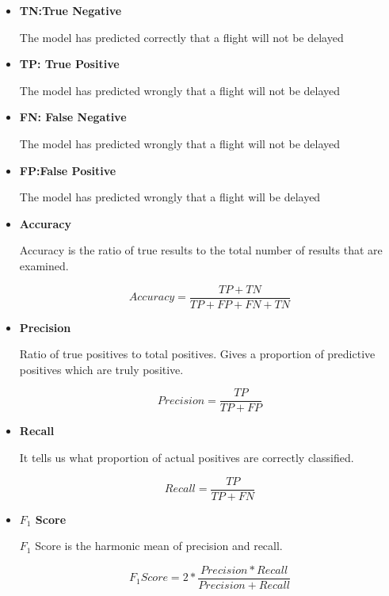 \documentclass[12pt,letter-paper]{article}
\begin{document}
        \begin{itemize}
            
            \item\textbf{TN:True Negative}
            
                The model has predicted correctly that a flight will not be delayed
                
            \item\textbf{TP: True Positive}
            
                The model has predicted wrongly that a flight will not be delayed
                
            \item\textbf{FN: False Negative}
            
                The model has predicted wrongly that a flight will not be delayed
                
            \item\textbf{FP:False Positive}
            
                The model has predicted wrongly that a flight will be delayed

        
            \item\textbf{Accuracy}
            
                 Accuracy is the ratio of true results to the total number of results that are examined.
             
                \[Accuracy = \frac{TP + TN }{TP + FP + FN + TN}\]
                
            
            \item\textbf{Precision}
            
                Ratio of true positives to total positives. Gives a proportion of predictive positives which are truly positive.
            
                \[Precision = \frac{TP}{TP + FP}\]
            
            \item\textbf{Recall}
            
                It tells us what proportion of actual positives are correctly classified.
            
                \[Recall = \frac{TP}{TP + FN}\]
            
            \item\textbf{$F_1$ Score}
            
                $F_1$ Score is the harmonic mean of precision and recall.
            
                \[F_1 Score = 2 * \frac{Precision * Recall}{Precision + Recall}\]
            
        \end{itemize}
        
\end{document}
